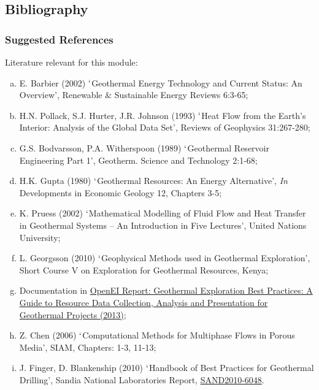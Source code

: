 \documentclass[10pt,compress]{beamer}
\begin{document}
 \subsection{Bibliography} 
   \begin{frame}
     \frametitle{Suggested References}\scriptsize
       Literature relevant for this module:
     \begin{enumerate}[(a)]\scriptsize
       \item E. Barbier (2002) $\lq$Geothermal Energy Technology and Current Status: An Overview', Renewable $\&$ Sustainable Energy Reviews 6:3-65;
       \item H.N. Pollack, S.J. Hurter, J.R. Johnson (1993) $\lq$Heat Flow from the Earth's Interior: Analysis of the Global Data Set', Reviews of Geophysics 31:267-280;
       \item G.S. Bodvarsson, P.A. Witherspoon (1989) $\lq$Geothermal Reservoir Engineering Part 1', Geotherm. Science and Technology 2:1-68;
       \item H.K. Gupta (1980) $\lq$Geothermal Resources: An Energy Alternative', {\it In} Developments in Economic Geology 12, Chapters 3-5;
       \item K. Pruess (2002) $\lq$Mathematical Modelling of Fluid Flow and Heat Transfer in Geothermal Systems -- An Introduction in Five Lectures', United Nations University;
       \item L. Georgsson (2010) $\lq$Geophysical Methods used in Geothermal Exploration', Short Course V on Exploration for Geothermal Resources, Kenya;
       \item Documentation in \href{http://en.openei.org/wiki/Geothermal_Exploration_Best_Practices:_A_Guide_to_Resource_Data_Collection,_Analysis_and_Presentation_for_Geothermal_Projects}{OpenEI Report: Geothermal Exploration Best Practices: A Guide to Resource Data Collection, Analysis and Presentation for Geothermal Projects (2013)};
       \item Z. Chen (2006) $\lq$Computational Methods for Multiphase Flows in Porous Media', SIAM, Chapters: 1-3, 11-13;
       \item J. Finger, D. Blankenship (2010) $\lq$Handbook of Best Practices for Geothermal Drilling', Sandia National Laboratories Report, \href{http://www1.eere.energy.gov/geothermal/pdfs/drillinghandbook.pdf}{SAND2010-6048}.
     \end{enumerate}
\end{frame}


\end{document}

